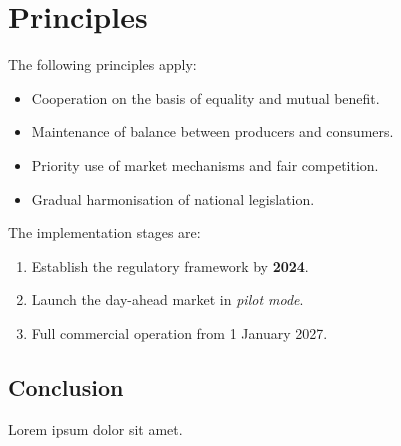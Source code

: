 \documentclass{article}
\begin{document}
\section{Principles}

The following principles apply:

\begin{itemize}
    \item Cooperation on the basis of equality and mutual benefit.
    \item Maintenance of balance between producers and consumers.
    \item Priority use of market mechanisms and fair competition.
    \item Gradual harmonisation of national legislation.
\end{itemize}

The implementation stages are:

\begin{enumerate}
    \item Establish the regulatory framework by \textbf{2024}.
    \item Launch the day-ahead market in \textit{pilot mode}.
    \item Full commercial operation from 1 January 2027.
\end{enumerate}

\subsection{Conclusion}

Lorem ipsum dolor sit amet.
\end{document}
